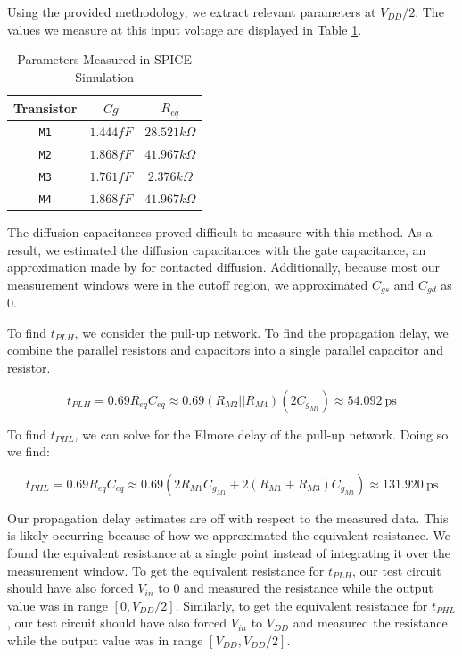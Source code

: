 \documentclass{article}
\begin{document}
	Using the provided methodology, we extract relevant parameters at $V_{DD}/2$. The values we measure at this input voltage are displayed in Table \ref{table::nand_gate_eq_params}.
	
	\begin{table}[H]
	\begin{center}
	\caption{Parameters Measured in SPICE Simulation}
	\label{table::nand_gate_eq_params}
	\begin{tabular}{| c | c | c |}
		\hline
		Transistor & $Cg$ & $R_{eq}$ \\
		\hline	
		\texttt{M1} & $1.444fF$ & $28.521k\Omega$ \\
		\hline
		\texttt{M2} & $1.868fF$ & $41.967k\Omega$ \\
		\hline
		\texttt{M3} & $1.761fF$ & $2.376k\Omega$ \\
		\hline
		\texttt{M4} & $1.868fF$ & $41.967k\Omega$ \\
		\hline
	\end{tabular}	
	\end{center}
	\end{table}
	
	\noindent The diffusion capacitances proved difficult to measure with this method. As a result, we estimated the diffusion capacitances with the gate capacitance, an approximation made by \cite{cmos_vlsi_design} for contacted diffusion. Additionally, because most our measurement windows were in the cutoff region, we approximated $C_{gs}$ and $C_{gd}$ as 0. 
	
	To find $t_{PLH}$, we consider the pull-up network. To find the propagation delay, we combine the parallel resistors and capacitors into a single parallel capacitor and resistor.
	
	\begin{equation}
		t_{PLH} = 0.69R_{eq}C_{eq} \approx 0.69(R_{M2}||R_{M4})(2C_{g_{M1}}) \approx 54.092\ \text{ps}
	\end{equation}
	
	\noindent To find $t_{PHL}$, we can solve for the Elmore delay of the pull-up network. Doing so we find:
	
	\begin{equation}
		t_{PHL} = 0.69R_{eq}C_{eq} \approx 0.69(2R_{M1}C_{g_{M1}} + 2(R_{M1} + R_{M3})C_{g_{M3}})\approx 131.920\ \text{ps}
	\end{equation}
	
	\noindent Our propagation delay estimates are off with respect to the measured data. This is likely occurring because of how we approximated the equivalent resistance. We found the equivalent resistance at a single point instead of integrating it over the measurement window. To get the equivalent resistance for $t_{PLH}$, our test circuit should have also forced $V_{in}$ to $0$ and measured the resistance while the output value was in range $[0, V_{DD}/2]$. Similarly, to get the equivalent resistance for $t_{PHL}$, our test circuit should have also forced $V_{in}$ to $V_{DD}$ and measured the resistance while the output value was in range $[V_{DD}, V_{DD}/2]$.
	
\end{document}

